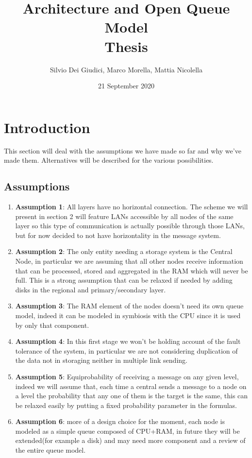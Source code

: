 \documentclass[11pt]{article}
\title {Architecture and Open Queue Model \\ \bigskip \large Thesis}
\author {Silvio Dei Giudici, Marco Morella, Mattia Nicolella}
\date{21 September 2020}
\begin{document}
\maketitle
\section{Introduction}
This section will deal with the assumptions we have made so far and why we've made them. Alternatives will be described for the various possibilities.\\
\subsection{Assumptions}
\begin{enumerate}
\item \textbf{Assumption 1}: All layers have no horizontal connection. The scheme we will present in section 2 will feature LANs accessible by all nodes of the same layer so this type of communication is actually possible through those LANs, but for now decided to not have horizontality in the message system.
\item \textbf{Assumption 2}: The only entity needing a storage system is the Central Node, in particular we are assuming that all other nodes receive information that can be processed, stored and aggregated in the RAM which will never be full. This is a strong assumption that can be relaxed if needed by adding disks in the regional and primary/secondary layer.
\item \textbf{Assumption 3}: The RAM element of the nodes doesn't need its own queue model, indeed it can be modeled in symbiosis with the CPU since it is used by only that component.
\item \textbf{Assumption 4}: In this first stage we won't be holding account of the fault tolerance of the system, in particular we are not considering duplication of the data not in storaging neither in multiple link sending.
\item \textbf{Assumption 5}: Equiprobability of receiving a message on any given level, indeed we will assume that, each time a central sends a message to a node on a level the probability that any one of them is the target is the same, this can be relaxed easily by putting a fixed probability parameter in the formulas.
\item \textbf{Assumption 6}: more of a design choice for the moment, each node is modeled as a simple queue composed of CPU+RAM, in future they will be extended(for example a disk) and may need more component and a review of the entire queue model.
\end{enumerate}
\end{document}
